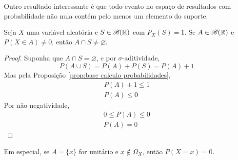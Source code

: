 Outro resultado interessante é que todo evento no espaço de resultados com probabilidade
não nula contém pelo menos um elemento do suporte.

\begin{prop:intersecao suporte}
\label{prop:intersecao suporte}
Seja $X$ uma variável aleatória e $S \in \mathcal{B}(\mathbb{R})$ com $P_X(S) = 1$.
Se $A \in \mathcal{B}(\mathbb{R})$ e $P(X \in A) \ne 0$, então $A \cap S \ne \varnothing$.
\begin{proof}
	Suponha que $A \cap S = \varnothing$, e por $\sigma$-aditividade,
	\[
		P(A \cup S) = P(A) + P(S) = P(A) + 1
	\]
	Mas pela Proposição \ref{prop:base calculo probabilidades},
	\begin{gather*}
		P(A) + 1 \le 1\\
		P(A) \le 0
	\end{gather*}
	Por não negatividade,
	\begin{gather*}
		0 \le P(A) \le 0\\
		P(A) = 0
	\end{gather*}
\end{proof}
\end{prop:intersecao suporte}

Em especial, se $A = \{x\}$ for unitário e $x \notin \Omega_X$, então $P(X = x) = 0$.
